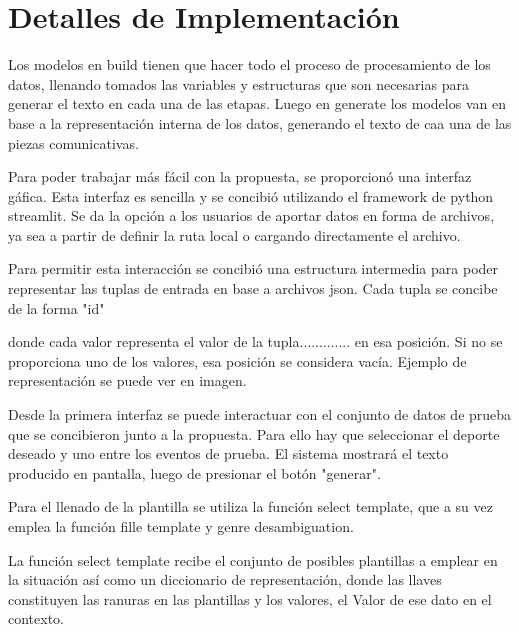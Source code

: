 \chapter{Detalles de Implementación}\label{chapter:implementation}


Los modelos en build tienen que hacer todo el proceso de procesamiento de los datos, llenando tomados
las variables y estructuras que son necesarias para generar el texto en cada una de las etapas. Luego
en generate los modelos van en base a la representación interna de los datos, generando el texto de 
caa una de las piezas comunicativas.








Para poder trabajar más fácil con la propuesta, se proporcionó una interfaz gáfica. Esta interfaz es sencilla
 y se concibió utilizando el framework de python streamlit. Se da la opción a los usuarios de aportar
 datos en forma de archivos, ya sea a partir de definir la ruta local o cargando directamente el archivo.

 Para permitir  esta interacción se concibió una estructura intermedia para poder representar las tuplas
 de entrada en base a archivos json.  Cada tupla se concibe de la forma "id"

 donde cada valor representa el valor de la tupla............. en esa posición. Si no se proporciona uno de los 
 valores, esa posición se considera vacía. Ejemplo de representación se puede ver en imagen.

 Desde la primera interfaz se puede interactuar con el conjunto de datos de prueba que se concibieron
junto a la propuesta. Para ello hay que seleccionar el deporte deseado y uno entre los eventos de prueba.
El sistema mostrará el texto producido en pantalla, luego de presionar el botón "generar".


 





Para el llenado de la plantilla se utiliza la función select template, que a su vez emplea la función
fille template  y genre desambiguation.

La función  select template recibe el conjunto de posibles plantillas a emplear en la situación así como un 
diccionario de representación, donde las llaves constituyen las ranuras en las plantillas y los valores, el Valor
de ese dato en el contexto.

